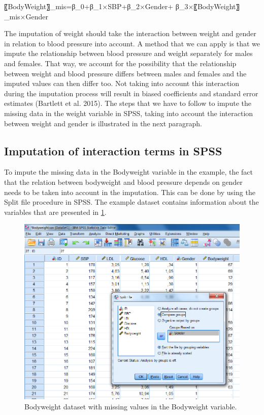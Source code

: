 \documentclass[]{book}
\begin{document}
〖BodyWeight〗\_mis=β\_0+β\_1×SBP+β\_2×Gender+
β\_3×〖BodyWeight〗\_mis×Gender

The imputation of weight should take the interaction between weight and
gender in relation to blood pressure into account. A method that we can
apply is that we impute the relationship between blood pressure and
weight separately for males and females. That way, we account for the
possibility that the relationship between weight and blood pressure
differs between males and females and the imputed values can then differ
too. Not taking into account this interaction during the imputation
process will result in biased coefficients and standard error estimates
(Bartlett et al. 2015). The steps that we have to follow to impute the
missing data in the weight variable in SPSS, taking into account the
interaction between weight and gender is illustrated in the next
paragraph.

\subsection{Imputation of interaction terms in
SPSS}\label{imputation-of-interaction-terms-in-spss}

To impute the missing data in the Bodyweight variable in the example,
the fact that the relation between bodyweight and blood pressure depends
on gender needs to be taken into account in the imputation. This can be
done by using the Split file procedure in SPSS. The example dataset
contains information about the variables that are presented in
\ref{fig:fig6-2}.

\begin{figure}

{\centering \includegraphics[width=0.9\linewidth]{images/fig6.2} 

}

\caption{Bodyweight dataset with missing values in the Bodyweight variable.}\label{fig:fig6-2}
\end{figure}
\end{document}
